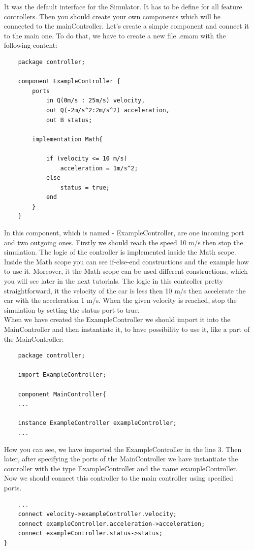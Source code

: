 It was the default interface for the Simulator. It has to be define for all feature controllers. Then you should create your own components which will be connected to the mainController. Let's create a simple component and connect it to the main one. To do that, we have to create a new file .emam with the following content:
\bigskip
\begin{lstlisting}
    package controller;

    component ExampleController {
	    ports
		    in Q(0m/s : 25m/s) velocity,
		    out Q(-2m/s^2:2m/s^2) acceleration,
		    out B status;

	    implementation Math{
		
		    if (velocity <= 10 m/s)
    	        acceleration = 1m/s^2;
    	    else
    	    	status = true;
            end
	    }
    }
\end{lstlisting}
\bigskip
In this component, which is named - ExampleController, are one incoming port and two outgoing ones. Firstly we should reach the speed 10 m/s then stop the simulation. The logic of the controller is implemented inside the Math{} scope. Inside the Math scope you can see if-else-end constructions and the example how to use it. Moreover, it the Math scope can be used different constructions, which you will see later in the next tutorials. The logic in this controller pretty straightforward, it the velocity of the car is less then 10 m/s then accelerate the car with the acceleration 1 m/s. When the given velocity is reached, stop the simulation by setting the status port to true. \\
When we have created the ExampleController we should import it into the MainController and then instantiate it, to have possibility to use it, like a part of the MainController:
\bigskip
\begin{lstlisting}
    package controller;

    import ExampleController;

    component MainController{ 
    ...

    instance ExampleController exampleController;
    ...
\end{lstlisting}
\bigskip
How you can see, we have imported the ExampleController in the line 3. Then later, after specifying the ports of the MainController we have instantiate the controller with the type ExampleController and the name exampleController. Now we should connect this controller to the main controller using specified ports.
\bigskip
\begin{lstlisting}
    ...
    connect velocity->exampleController.velocity;
    connect exampleController.acceleration->acceleration;
    connect exampleController.status->status;
}
\end{lstlisting}
